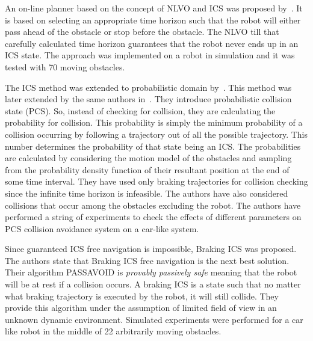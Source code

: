 An on-line planner based on the concept of NLVO and ICS was proposed by~\cite{gal2009efficient}\cite{shiller2010nonlinear}. It is based on selecting an appropriate time horizon such that the robot will either pass ahead of the obstacle or stop before the obstacle. The NLVO till that carefully calculated time horizon guarantees that the robot never ends up in an ICS state. The approach was implemented on a robot in simulation and it was tested with 70 moving obstacles. 

The ICS method was extended to probabilistic domain by~\cite{althoff2010probabilistic}. This method was later extended by the same authors in~\cite{althoff2012safety}. They introduce probabilistic collision state (PCS). So, instead of checking for collision, they are calculating the probability for collision. This probability is simply the minimum probability of a collision occurring by following a trajectory out of all the possible trajectory. This number determines the probability of that state being an ICS\@. The probabilities are calculated by considering the motion model of the obstacles and sampling from the probability density function of their resultant position at the end of some time interval. They have used only braking trajectories for collision checking since the infinite time horizon is infeasible. The authors have also considered collisions that occur among the obstacles excluding the robot. The authors have performed a string of experiments to check the effects of different parameters on PCS collision avoidance system on a car-like system.

Since guaranteed ICS free navigation is impossible, Braking ICS was proposed\cite{bouraine2012provably}. The authors state that Braking ICS free navigation is the next best solution. Their algorithm PASSAVOID is \textit{provably passively safe} meaning that the robot will be at rest if a collision occurs. A braking ICS is a state such that no matter what braking trajectory is executed by the robot, it will still collide. They provide this algorithm under the assumption of limited field of view in an unknown dynamic environment. Simulated experiments were performed for a car like robot in the middle of 22 arbitrarily moving obstacles.

